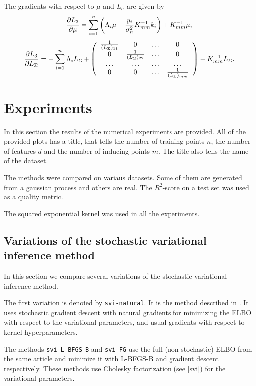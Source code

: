 \documentclass[12pt]{article}
\begin{document}
		The gradients with respect to $\mu$ and $L_{\sigma}$ are given by
		$$
		\frac{\partial L_3}{\partial \mu} =  \sum_{i=1}^n \left(\Lambda_i \mu - \frac {y_i}{\sigma_n^2} K_{mm}^{-1} k_i \right) + K_{mm}^{-1} \mu,
		$$
		$$\frac{\partial L_3}{\partial L_{\Sigma}} = - \sum_{i=1}^n \Lambda_i L_{\Sigma} +
		\left(
		\begin{array}{cccc}
		\frac 1 {(L_{\Sigma})_{11}} & 0 & \ldots & 0\\
		0 & \frac 1 {(L_{\Sigma})_{22}} & \ldots & 0\\
		\ldots & \ldots & \ldots & \ldots\\
		0 & 0 & \ldots & \frac 1 {(L_{\Sigma})_{mm}} \\
		\end{array}   
		\right) 
		- K_{mm}^{-1} L_{\Sigma}.
		$$

	\pagebreak
\section{Experiments}
	In this section the results of the numerical experiments are provided. All of the provided plots has a title, that tells the number of training points $n$, the number of features $d$ and the number of inducing points $m$. The title also tells the name of the dataset.

	The methods were compared on variaus datasets. Some of them are generated from a gaussian process and others are real. The $R^2$-score on a test set was used as a quality metric. 

	The squared exponential kernel was used in all the experiments.

	\subsection{Variations of the stochastic variational inference method}
		In this section we compare several variations of the stochastic variational inference method.

		The first variation is denoted by \lstinline{svi-natural}. It is the method described in \cite{BigData}. It uses stochastic gradient descent with natural gradients for minimizing the ELBO with respect to the variational parameters, and usual gradients with respect to kernel hyperparameters.

		The methods \lstinline{svi-L-BFGS-B} and \lstinline{svi-FG} use the full (non-stochastic) ELBO from the same article \cite{BigData} and minimize it with L-BFGS-B and gradient descent respectively. These methods use Cholesky factorization (see \ref{svi}) for the variational parameters.
\end{document}

